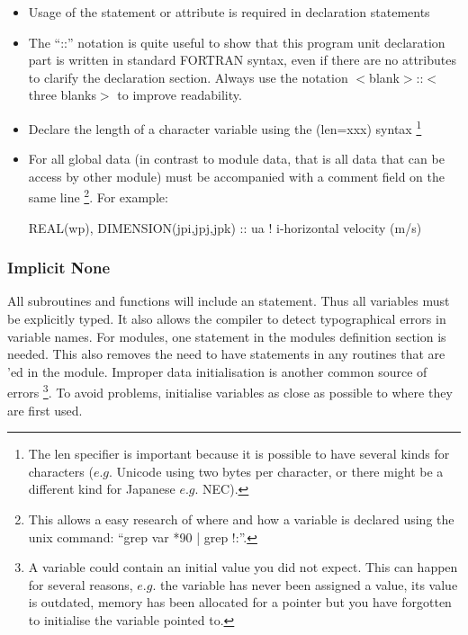 \begin{itemize}
\item
  Usage of the  statement or attribute is required in declaration statements
\item
  The ``::'' notation is quite useful to show that this program unit declaration part is written in
  standard FORTRAN syntax, even if there are no attributes to clarify the declaration section.
  Always use the notation $<$blank$>$::$<$three blanks$>$ to improve readability.
\item
  Declare the length of a character variable using the  (len=xxx) syntax
  \footnote {
    The len specifier is important because it is possible to have several kinds for characters
    ($e.g.$ Unicode using two bytes per character, or there might be a different kind for Japanese $e.g.$ NEC).
  }
\item
  For all global data (in contrast to module data, that is all data that can be access by other module)
  must be accompanied with a comment field on the same line
  \footnote {
    This allows a easy research of where and how a variable is declared using the unix command:
    ``grep var *90 | grep !:''.
  }.
  For example:
  \begin{forlines}
  REAL(wp), DIMENSION(jpi,jpj,jpk) ::  ua   ! i-horizontal velocity (m/s)
  \end{forlines}
\end{itemize}

\subsubsection{Implicit None}

All subroutines and functions will include an  statement.
Thus all variables must be explicitly typed.
It also allows the compiler to detect typographical errors in variable names.
For modules, one  statement in the modules definition section is needed.
This also removes the need to have  statements in
any routines that are 'ed in the module.
Improper data initialisation is another common source of errors
\footnote{
  A variable could contain an initial value you did not expect.
  This can happen for several reasons, $e.g.$ the variable has never been assigned a value, its value is outdated,
  memory has been allocated for a pointer but you have forgotten to initialise the variable pointed to.
}.
To avoid problems, initialise variables as close as possible to where they are first used.

